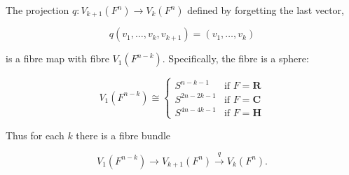 The projection $q: V_{k+1}(F^n) \to V_k(F^n)$ defined by forgetting the last vector,

$$q(v_1, \ldots, v_k, v_{k+1}) = (v_1, \ldots, v_k)$$

is a fibre map with fibre $V_1(F^{n-k})$. Specifically, the fibre is a sphere:

$$V_1(F^{n-k}) \cong \begin{cases}
S^{n-k-1} & \text{if } F = \mathbf{R} \\
S^{2n-2k-1} & \text{if } F = \mathbf{C} \\
S^{4n-4k-1} & \text{if } F = \mathbf{H}
\end{cases}$$

Thus for each $k$ there is a fibre bundle

$$V_1(F^{n-k}) \longrightarrow V_{k+1}(F^n) \xrightarrow{q} V_k(F^n).$$
